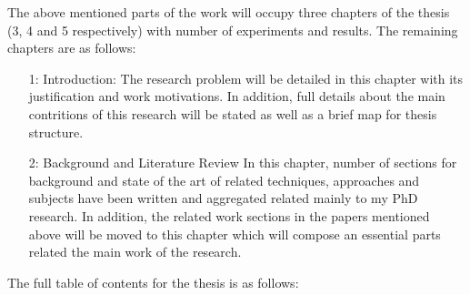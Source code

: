 \documentclass[10pt,conference,twocolumn]{IEEEtran}
\begin{document}
The above mentioned parts of the work will occupy three
chapters of the thesis (3, 4 and 5 respectively) with number
of experiments and results.
The remaining chapters are as follows:
\begin{itemize}
\item[1:] Introduction: The research problem will be detailed in this
chapter with its justification and work motivations. In
addition, full details about the main contritions of this
research will be stated as well as a brief map for thesis
structure.
\item[2:] Background and Literature Review In this chapter, number
of sections for background and state of the art of
related techniques, approaches and subjects have been
written and aggregated related mainly to my PhD
research. In addition, the related work sections in the
papers mentioned above will be moved to this chapter
which will compose an essential parts related the main
work of the research.
\end{itemize}
The full table of contents for the thesis is as follows:
\end{document}
